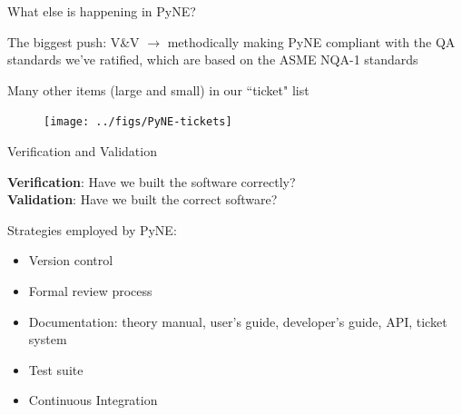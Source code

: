 \documentclass[xcolor=x11names,compress]{beamer}
\renewcommand{\(}{\begin{columns}}
\renewcommand{\)}{\end{columns}}
\newcommand{\<}[1]{\begin{column}{#1}}
\renewcommand{\>}{\end{column}}
\begin{document}
\begin{frame}{What else is happening in PyNE?}

    The biggest push: \alert{V\&V} $\rightarrow$ methodically making PyNE compliant
    with the QA standards we've ratified, which are based on the ASME NQA-1 standards
    \cite{pyne_vnv}

    \vspace*{1 em}
    Many other items (large and small) in our ``ticket" list

    \begin{center}
 	\begin{figure}
 	\texttt{[image: ../figs/PyNE-tickets]}
    \end{figure}
 	\end{center}

\end{frame}

\begin{frame}{Verification and Validation}

    \textbf{Verification}: Have we built the software correctly?\\
    \textbf{Validation}: Have we built the correct software?

    \vspace*{1 em}
    Strategies employed by PyNE:

    \begin{itemize}
      \item Version control
      \item Formal review process
      \item Documentation: theory manual, user's guide, developer's guide, API,
      ticket system
      \item Test suite
      \item Continuous Integration
    \end{itemize}

\end{frame}

\end{document}
